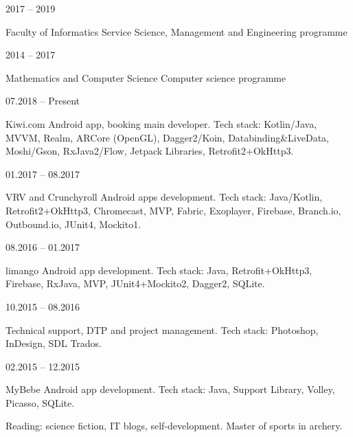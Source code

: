 \documentclass[12pt, a4paper]{article}
\begin{document}
\begin{minipage}[t]{0.6\textwidth}
    
     \hfill 2017 – 2019
    
    Faculty of Informatics \newline
    Service Science, Management and Engineering programme
    
     \hfill 2014 – 2017
    
    Mathematics and Computer Science \newline
    Computer science programme
    
    
     \hfill 07.2018 – Present
    
    Kiwi.com Android app, booking main developer. \newline
    Tech stack: Kotlin/Java, MVVM, Realm, ARCore (OpenGL), \newline
    Dagger2/Koin, Databinding\&LiveData, Moshi/Gson, \newline
    RxJava2/Flow, Jetpack Libraries, Retrofit2+OkHttp3.
    
     \hfill 01.2017 – 08.2017
    
    VRV and Crunchyroll Android apps development.
    Tech stack: Java/Kotlin, Retrofit2+OkHttp3, Chromecast, MVP, Fabric, Exoplayer, Firebase, Branch.io, Outbound.io, JUnit4, Mockito1.
   
     \hfill 08.2016 – 01.2017
    
    limango Android app development. \newline
    Tech stack: Java, Retrofit+OkHttp3, Firebase, RxJava, MVP, \newline
    JUnit4+Mockito2, Dagger2, SQLite.
    
     \hfill 10.2015 – 08.2016
    
    Technical support, DTP and project management. \newline
    Tech stack: Photoshop, InDesign, SDL Trados.
    
     \hfill 02.2015 – 12.2015
    
    MyBebe Android app development. \newline
    Tech stack: Java, Support Library, Volley, Picasso, SQLite.

    
    Reading: science fiction, IT blogs, self-development. Master of sports in archery.
\end{minipage}\\
\end{document}

